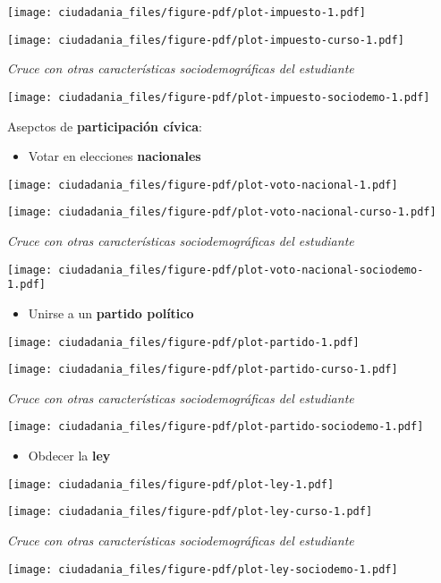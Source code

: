 \documentclass[
  letterpaper,
  DIV=11,
  numbers=noendperiod]{scrreprt}
\providecommand{\tightlist}{%
  \setlength{\itemsep}{0pt}\setlength{\parskip}{0pt}}\usepackage{longtable,booktabs,array}
\begin{document}
\texttt{[image: ciudadania\_files/figure-pdf/plot-impuesto-1.pdf]}

\texttt{[image: ciudadania\_files/figure-pdf/plot-impuesto-curso-1.pdf]}

\emph{Cruce con otras características sociodemográficas del estudiante}

\texttt{[image: ciudadania\_files/figure-pdf/plot-impuesto-sociodemo-1.pdf]}

Asepctos de \textbf{participación cívica}:

\begin{itemize}
\tightlist
\item
  Votar en elecciones \textbf{nacionales}
\end{itemize}

\texttt{[image: ciudadania\_files/figure-pdf/plot-voto-nacional-1.pdf]}

\texttt{[image: ciudadania\_files/figure-pdf/plot-voto-nacional-curso-1.pdf]}

\emph{Cruce con otras características sociodemográficas del estudiante}

\texttt{[image: ciudadania\_files/figure-pdf/plot-voto-nacional-sociodemo-1.pdf]}

\begin{itemize}
\tightlist
\item
  Unirse a un \textbf{partido político}
\end{itemize}

\texttt{[image: ciudadania\_files/figure-pdf/plot-partido-1.pdf]}

\texttt{[image: ciudadania\_files/figure-pdf/plot-partido-curso-1.pdf]}

\emph{Cruce con otras características sociodemográficas del estudiante}

\texttt{[image: ciudadania\_files/figure-pdf/plot-partido-sociodemo-1.pdf]}

\begin{itemize}
\tightlist
\item
  Obdecer la \textbf{ley}
\end{itemize}

\texttt{[image: ciudadania\_files/figure-pdf/plot-ley-1.pdf]}

\texttt{[image: ciudadania\_files/figure-pdf/plot-ley-curso-1.pdf]}

\emph{Cruce con otras características sociodemográficas del estudiante}

\texttt{[image: ciudadania\_files/figure-pdf/plot-ley-sociodemo-1.pdf]}
\end{document}
